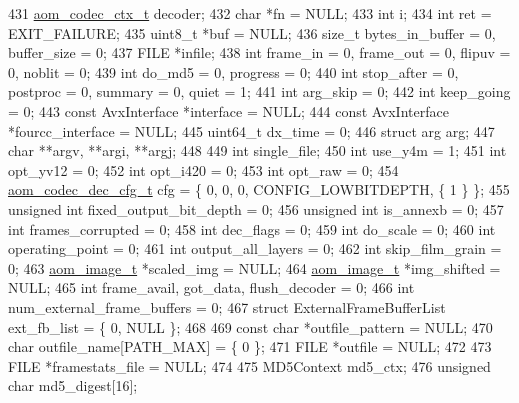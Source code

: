 \begin{DoxyCodeInclude}
{{{{{{{{{{{{{{{{{{{{{{{{{431   \hyperlink{structaom__codec__ctx}{aom\_codec\_ctx\_t} decoder;
432   \textcolor{keywordtype}{char} *fn = NULL;
433   \textcolor{keywordtype}{int} i;
434   \textcolor{keywordtype}{int} ret = EXIT\_FAILURE;
435   uint8\_t *buf = NULL;
436   \textcolor{keywordtype}{size\_t} bytes\_in\_buffer = 0, buffer\_size = 0;
437   FILE *infile;
438   \textcolor{keywordtype}{int} frame\_in = 0, frame\_out = 0, flipuv = 0, noblit = 0;
439   \textcolor{keywordtype}{int} do\_md5 = 0, progress = 0;
440   \textcolor{keywordtype}{int} stop\_after = 0, postproc = 0, summary = 0, quiet = 1;
441   \textcolor{keywordtype}{int} arg\_skip = 0;
442   \textcolor{keywordtype}{int} keep\_going = 0;
443   \textcolor{keyword}{const} AvxInterface *\textcolor{keyword}{interface }= NULL;
444   \textcolor{keyword}{const} AvxInterface *fourcc\_interface = NULL;
445   uint64\_t dx\_time = 0;
446   \textcolor{keyword}{struct }arg arg;
447   \textcolor{keywordtype}{char} **argv, **argi, **argj;
448 
449   \textcolor{keywordtype}{int} single\_file;
450   \textcolor{keywordtype}{int} use\_y4m = 1;
451   \textcolor{keywordtype}{int} opt\_yv12 = 0;
452   \textcolor{keywordtype}{int} opt\_i420 = 0;
453   \textcolor{keywordtype}{int} opt\_raw = 0;
454   \hyperlink{structaom__codec__dec__cfg}{aom\_codec\_dec\_cfg\_t} cfg = \{ 0, 0, 0, CONFIG\_LOWBITDEPTH, \{ 1 \} \};
455   \textcolor{keywordtype}{unsigned} \textcolor{keywordtype}{int} fixed\_output\_bit\_depth = 0;
456   \textcolor{keywordtype}{unsigned} \textcolor{keywordtype}{int} is\_annexb = 0;
457   \textcolor{keywordtype}{int} frames\_corrupted = 0;
458   \textcolor{keywordtype}{int} dec\_flags = 0;
459   \textcolor{keywordtype}{int} do\_scale = 0;
460   \textcolor{keywordtype}{int} operating\_point = 0;
461   \textcolor{keywordtype}{int} output\_all\_layers = 0;
462   \textcolor{keywordtype}{int} skip\_film\_grain = 0;
463   \hyperlink{structaom__image}{aom\_image\_t} *scaled\_img = NULL;
464   \hyperlink{structaom__image}{aom\_image\_t} *img\_shifted = NULL;
465   \textcolor{keywordtype}{int} frame\_avail, got\_data, flush\_decoder = 0;
466   \textcolor{keywordtype}{int} num\_external\_frame\_buffers = 0;
467   \textcolor{keyword}{struct }ExternalFrameBufferList ext\_fb\_list = \{ 0, NULL \};
468 
469   \textcolor{keyword}{const} \textcolor{keywordtype}{char} *outfile\_pattern = NULL;
470   \textcolor{keywordtype}{char} outfile\_name[PATH\_MAX] = \{ 0 \};
471   FILE *outfile = NULL;
472 
473   FILE *framestats\_file = NULL;
474 
475   MD5Context md5\_ctx;
476   \textcolor{keywordtype}{unsigned} \textcolor{keywordtype}{char} md5\_digest[16];
}}}}}}}}}}}}}}}}}}}}}}}}}
\end{DoxyCodeInclude}
